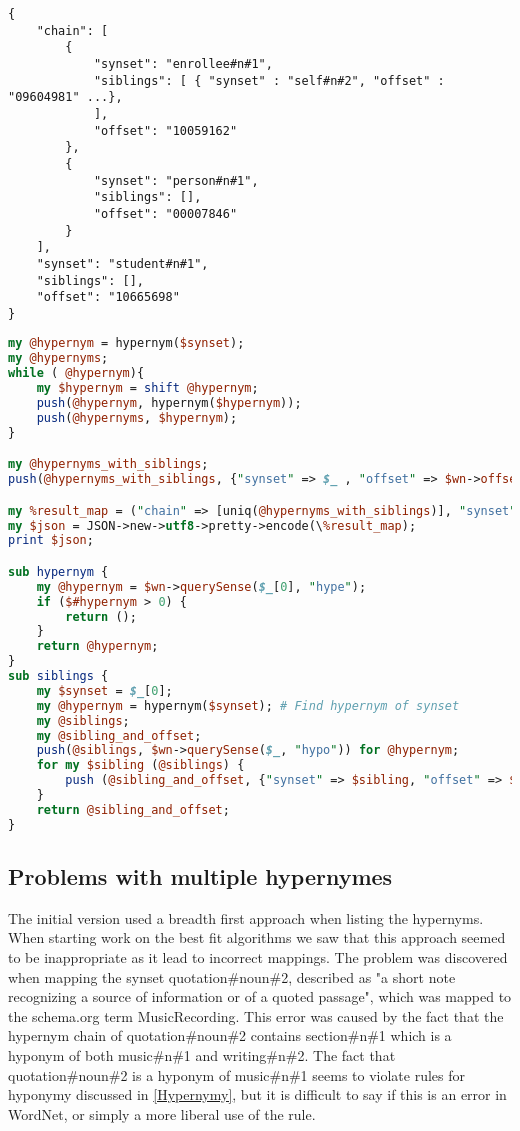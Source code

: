 \begin{lstlisting}[label=PerlHypernymChain, caption={Excerpt from the hypernym chain for student\#n\#1}]
{
	"chain": [
		{
			"synset": "enrollee#n#1",
			"siblings": [ { "synset" : "self#n#2", "offset" : "09604981" ...},
			],
			"offset": "10059162"
		},
		{
			"synset": "person#n#1",
			"siblings": [],
			"offset": "00007846"
		}
	],
	"synset": "student#n#1",
	"siblings": [],
	"offset": "10665698"
}
\end{lstlisting}

\begin{lstlisting}[language=perl, label=HypernymChainCode, caption={Excerpt from the hypernym chain perl script}]
my @hypernym = hypernym($synset);
my @hypernyms;
while ( @hypernym){
	my $hypernym = shift @hypernym;
	push(@hypernym, hypernym($hypernym));
	push(@hypernyms, $hypernym);
}

my @hypernyms_with_siblings;
push(@hypernyms_with_siblings, {"synset" => $_ , "offset" => $wn->offset($_) ,"siblings" => [siblings($_)]}) for @hypernyms;

my %result_map = ("chain" => [uniq(@hypernyms_with_siblings)], "synset" => $synset, "offset"=> $wn->offset($synset), "siblings" => [siblings($synset)]);
my $json = JSON->new->utf8->pretty->encode(\%result_map);
print $json;

sub hypernym {
	my @hypernym = $wn->querySense($_[0], "hype");
	if ($#hypernym > 0) {
		return ();
	}
	return @hypernym;
}
sub siblings {
	my $synset = $_[0];
	my @hypernym = hypernym($synset); # Find hypernym of synset
	my @siblings;
	my @sibling_and_offset;
	push(@siblings, $wn->querySense($_, "hypo")) for @hypernym;
	for my $sibling (@siblings) {
		push (@sibling_and_offset, {"synset" => $sibling, "offset" => $wn->offset($sibling)});
	}
	return @sibling_and_offset;
}
\end{lstlisting}

\subsection{Problems with multiple hypernymes}
The initial version used a breadth first approach when listing the hypernyms.
When starting work on the best fit algorithms we saw that this approach seemed to be inappropriate as it lead to incorrect mappings.
The problem was discovered when mapping the synset quotation\#noun\#2,
described as "a short note recognizing a source of information or of a quoted passage",
which was mapped to the schema.org term MusicRecording.
This error was caused by the fact that the hypernym chain of quotation\#noun\#2 contains
section\#n\#1 which is a hyponym of both music\#n\#1 and writing\#n\#2.
The fact that quotation\#noun\#2 is a hyponym of music\#n\#1 seems to violate rules for hyponymy discussed in \ref{Hypernymy},
but it is difficult to say if this is an error in WordNet, or simply a more liberal use of the rule.

